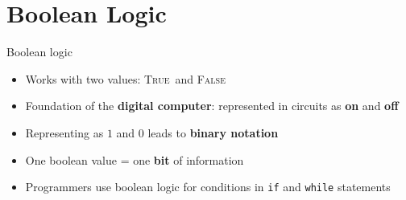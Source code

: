 \part{Boolean Logic}
\frame{\partpage}

\newcommand{\TT}{\textsc{True}}
\newcommand{\FF}{\textsc{False}}
\newcommand{\OP}[1]{\ \textsc{#1}\ }
\newcommand{\OPand}{\OP{and}}
\newcommand{\OPor}{\OP{or}}
\newcommand{\OPxor}{\OP{xor}}
\newcommand{\OPnand}{\OP{nand}}
\newcommand{\OPnor}{\OP{nor}}
\newcommand{\OPxnor}{\OP{xnor}}
\newcommand{\OPnot}{\textsc{not}\ }

\newcommand{\OPname}{}
\newcommand{\OPenglishA}{}
\newcommand{\OPenglishB}{}
\newcommand{\OPtable}{}
\newcommand{\OPdiagram}{}

\newcommand{\OPframe}[5]{
	\begin{frame}{#1}
		\pause
		\begin{center}
			#2 \par if and only if \par #3
		\end{center}
		\pause
		\begin{columns}
			\begin{column}{0.48\textwidth}
				\begin{center}
					#4
				\end{center}
			\end{column}
			\pause
			\begin{column}{0.48\textwidth}
				\begin{center}
					\begin{circuitikz} \draw[color=\circuitcolour]
						#5
					\end{circuitikz}
				\end{center}
			\end{column}
		\end{columns}
	\end{frame}
}

\begin{frame}{Boolean logic}
	\begin{itemize}
		\pause\item Works with two values: \TT\ and \FF
		\pause\item Foundation of the \textbf{digital computer}:
			represented in circuits as \textbf{on} and \textbf{off}
		\pause\item Representing as $1$ and $0$ leads to \textbf{binary notation}
		\pause\item One boolean value = one \textbf{bit} of information
		\pause\item Programmers use boolean logic for conditions in \lstinline{if} and \lstinline{while}
			statements
	\end{itemize}
\end{frame}

